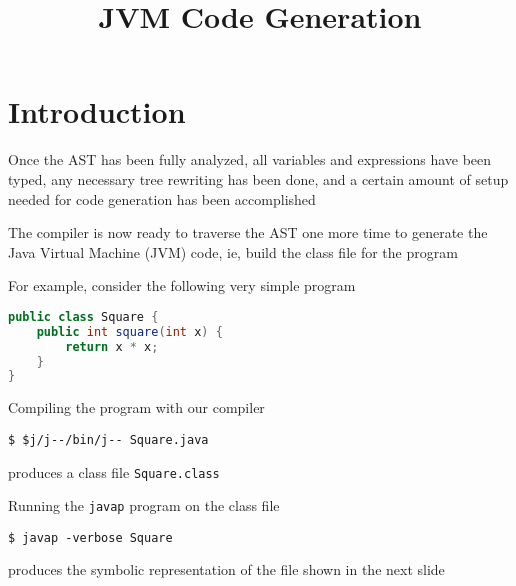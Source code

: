 \documentclass[8pt,a4paper,compress]{beamer}
\title{JVM Code Generation}
\date{}
\begin{document}
\begin{frame}
\vfill
\titlepage
\end{frame}

\section{Introduction}
\begin{frame}[fragile]
\pause

Once the AST has been fully analyzed, all variables and expressions have been typed, any necessary tree rewriting has been done, and a certain amount of setup needed for code generation has been accomplished

\pause
\bigskip

The compiler is now ready to traverse the AST one more time to generate the Java Virtual Machine (JVM) code, ie, build the class file for the program

\pause
\bigskip

For example, consider the following very simple program

\smallskip

\begin{lstlisting}[language=Java,style=focusin]
public class Square {
    public int square(int x) {
        return x * x;
    }
}
\end{lstlisting}

\pause
\bigskip

Compiling the program with our \jmm compiler

\smallskip

\begin{lstlisting}[language={},style=focusin]
$ $j/j--/bin/j-- Square.java
\end{lstlisting}
produces a class file \lstinline{Square.class}

\pause
\bigskip

Running the \lstinline{javap} program on the class file

\smallskip

\begin{lstlisting}[language={},style=focusin]
$ javap -verbose Square
\end{lstlisting}
produces the symbolic representation of the file shown in the next slide
\end{frame}
\end{document}
